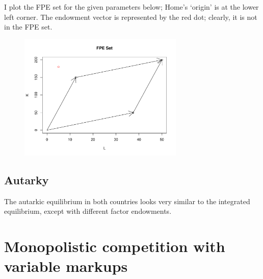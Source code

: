 \documentclass[12pt]{article}
\begin{document}
I plot the FPE set for the given parameters below; Home's `origin' is at the lower left corner. The endowment vector is represented by the red dot; clearly, it is not in the FPE set.

\begin{figure}[!htpb]
    \centering
    
        \includegraphics[width=0.7\textwidth]{fpeset.pdf}

\end{figure}

\subsection{Autarky}
The autarkic equilibrium in both countries looks very similar to the integrated equilibrium, except with different factor endowments. 


\newpage

\section{Monopolistic competition with variable markups}
\end{document}
